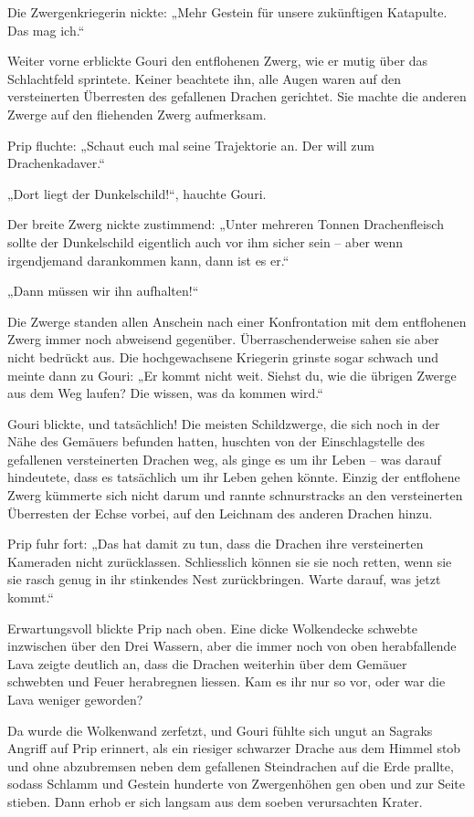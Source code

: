 Die Zwergenkriegerin nickte: „Mehr Gestein für unsere zukünftigen Katapulte. Das mag ich.“

Weiter vorne erblickte Gouri den entflohenen Zwerg, wie er mutig über das Schlachtfeld sprintete. Keiner beachtete ihn, alle Augen waren auf den versteinerten Überresten des gefallenen Drachen gerichtet. Sie machte die anderen Zwerge auf den fliehenden Zwerg aufmerksam.

Prip fluchte: „Schaut euch mal seine Trajektorie an. Der will zum Drachenkadaver.“

„Dort liegt der Dunkelschild!“, hauchte Gouri.

Der breite Zwerg nickte zustimmend: „Unter mehreren Tonnen Drachenfleisch sollte der Dunkelschild eigentlich auch vor ihm sicher sein – aber wenn irgendjemand darankommen kann, dann ist es er.“

„Dann müssen wir ihn aufhalten!“

Die Zwerge standen allen Anschein nach einer Konfrontation mit dem entflohenen Zwerg immer noch abweisend gegenüber. Überraschenderweise sahen sie aber nicht bedrückt aus. Die hochgewachsene Kriegerin grinste sogar schwach und meinte dann zu Gouri: „Er kommt nicht weit. Siehst du, wie die übrigen Zwerge aus dem Weg laufen? Die wissen, was da kommen wird.“

Gouri blickte, und tatsächlich! Die meisten Schildzwerge, die sich noch in der Nähe des Gemäuers befunden hatten, huschten von der Einschlagstelle des gefallenen versteinerten Drachen weg, als ginge es um ihr Leben – was darauf hindeutete, dass es tatsächlich um ihr Leben gehen könnte. Einzig der entflohene Zwerg kümmerte sich nicht darum und rannte schnurstracks an den versteinerten Überresten der Echse vorbei, auf den Leichnam des anderen Drachen hinzu.

Prip fuhr fort: „Das hat damit zu tun, dass die Drachen ihre versteinerten Kameraden nicht zurücklassen. Schliesslich können sie sie noch retten, wenn sie sie rasch genug in ihr stinkendes Nest zurückbringen. Warte darauf, was jetzt kommt.“

Erwartungsvoll blickte Prip nach oben. Eine dicke Wolkendecke schwebte inzwischen über den Drei Wassern, aber die immer noch von oben herabfallende Lava zeigte deutlich an, dass die Drachen weiterhin über dem Gemäuer schwebten und Feuer herabregnen liessen. Kam es ihr nur so vor, oder war die Lava weniger geworden?

Da wurde die Wolkenwand zerfetzt, und Gouri fühlte sich ungut an Sagraks Angriff auf Prip erinnert, als ein riesiger schwarzer Drache aus dem Himmel stob und ohne abzubremsen neben dem gefallenen Steindrachen auf die Erde prallte, sodass Schlamm und Gestein hunderte von Zwergenhöhen gen oben und zur Seite stieben. Dann erhob er sich langsam aus dem soeben verursachten Krater.


